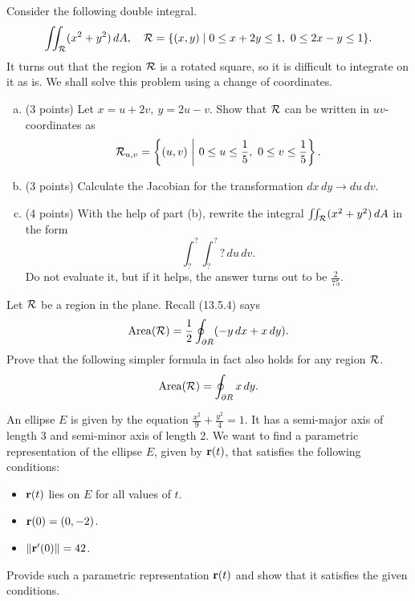 \documentclass[11pt,oneside]{amsart}
\begin{document}
\newpage

\begin{problem}
  Consider the following double integral.
  \[\iint_\mathcal R (x^2+y^2)\,dA,\quad\mathcal R=\{(x,y)\mid 0\leq x+2y\leq 1,\ 0\leq 2x-y\leq 1\}.\]
  It turns out that the region $\mathcal R$ is a rotated square, so it is difficult to integrate on it as is. We shall solve this problem using a change of coordinates.
  \begin{enumerate}[(a)]
    \item (3 points) Let $x=u+2v,\ y=2u-v$. Show that $\mathcal R$ can be written in $uv$-coordinates as
    \[\cR_{u,v}=\left\{(u,v) \ \middle|\  0\leq u\leq \frac15,\ 0\leq v\leq \frac15 \right\}.\]
    \vfil
    \item (3 points) Calculate the Jacobian for the transformation $dx\,dy\to du\,dv$.
    \newpage
    \item (4 points) With the help of part (b), rewrite the integral $\iint_\mathcal R (x^2+y^2)\,dA$ in the form
    \[\int_{\boxed ?}^{\boxed ?}\int_{\boxed ?}^{\boxed ?}\boxed ?\,du\,dv.\]
    Do not evaluate it, but if it helps, the answer turns out to be $\frac2{75}$.
  \end{enumerate}
\end{problem}

\newpage

\begin{problem}[10 points]
  Let $\mathcal R$ be a region in the plane. Recall (13.5.4) says
  \[\operatorname{Area}(\mathcal R)=\frac12\oint_{\partial R}(-y\,dx+x\,dy).\]
  Prove that the following simpler formula in fact also holds for any region $\mathcal R$.
  \[\operatorname{Area}(\mathcal R)=\oint_{\partial R}x\,dy.\]
\end{problem}

\newpage

\begin{problem}[10 points]
  An ellipse $E$ is given by the equation $\frac{x^2}{9}+\frac{y^2}{4}=1$. It has a semi-major axis of length 3 and semi-minor axis of length 2. We want to find a parametric representation of the ellipse $E$, given by $\mathbf r(t)$, that satisfies the following conditions:
  \begin{itemize}
    \item $\mathbf r(t)$ lies on $E$ for all values of $t$.
    \item $\mathbf r(0)=(0,-2)$.
    \item $\|\mathbf r'(0)\|=42$.
  \end{itemize}
  Provide such a parametric representation $\mathbf r(t)$ and show that it satisfies the given conditions.
\end{problem}
\end{document}
